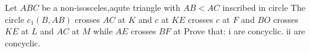 Let $ABC$ be a non-isosceles,aqute triangle with $AB<AC$ inscribed in circle The circle $c_{1}(B,AB)$ crosses $AC$ at $K$ and $c$ at 
$KE$ crosses $c$ at $F$ and $BO$ crosses $KE$ at $L$ and $AC$ at $M$ while $AE$ crosses $BF$ at Prove that:
i are concyclic.
ii are concyclic.